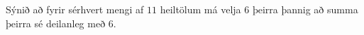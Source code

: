 Sýnið að fyrir sérhvert mengi af $11$ heiltölum má velja $6$ þeirra þannig að summa þeirra sé deilanleg með $6$.